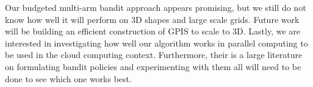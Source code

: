 \documentclass[letterpaper, 10 pt, conference]{ieeeconf}  %
\begin{document}
Our budgeted multi-arm bandit approach appears promising, but we still do not know how well it will perform on 3D shapes and large scale grids. Future work will be building an efficient construction of GPIS to scale to 3D. Lastly, we are interested in investigating how well our algorithm works in parallel computing to be used in the cloud computing context. Furthermore, their is a large literature on formulating bandit policies and experimenting with them all will need to be done to see which one works best. 



\end{document}
